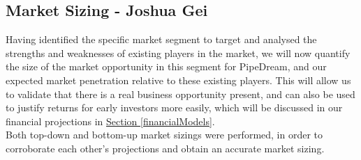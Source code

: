 \documentclass[11pt]{article}		%
\newcommand{\supercite}[1]{\textsuperscript{\cite{#1}}}		%
\newcommand{\sectref}[1]{\hyperref[#1]{Section \ref*{#1}}}     %
\begin{document}
	        
	        
	        
	        
	        
	        
    \subsection[Market Sizing]{Market Sizing - Joshua Gei}\label{marketSizing}
        Having identified the specific market segment to target and analysed the strengths and weaknesses of existing players in the market, we will now quantify the size of the market opportunity in this segment for PipeDream, and our expected market penetration relative to these existing players. This will allow us to validate that there is a real business opportunity present, and can also be used to justify returns for early investors more easily, which will be discussed in our financial projections in \sectref{financialModels}. 
        \\
        \hspace*{3ex}Both top-down and bottom-up market sizings were performed, in order to corroborate each other's projections and obtain an accurate market sizing.  
\end{document}
